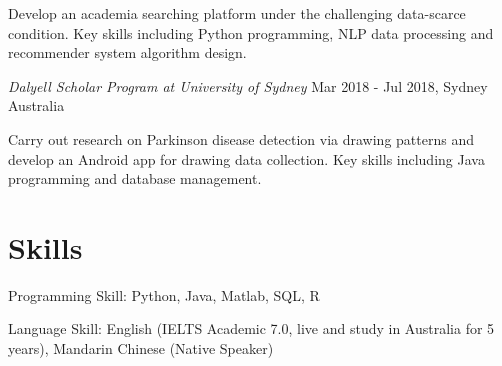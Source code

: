 \documentclass[letterpaper,11pt]{article}
\begin{document}
Develop an academia searching platform under the challenging data-scarce condition. Key skills including Python programming, NLP data processing and recommender system algorithm design. 

\vspace{9pt}

\textit{Dalyell Scholar Program at University of Sydney} \hfill Mar 2018 - Jul 2018, Sydney Australia

Carry out research on Parkinson disease detection via drawing patterns and develop an Android app for drawing data collection. Key skills including Java programming and database management. 

\vspace{1pt}

\section{Skills}
Programming Skill: Python, Java, Matlab, SQL, R

Language Skill: English (IELTS Academic 7.0, live and study in Australia for 5 years), Mandarin Chinese (Native Speaker)
\end{document}
